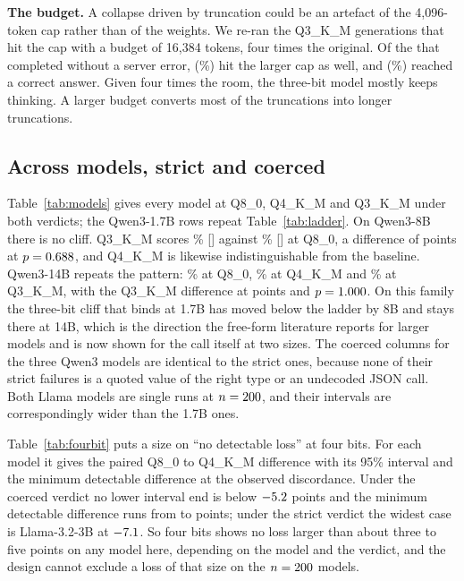 \documentclass[12pt,letterpaper]{article}
\newcommand{\qm}{Qwen3-1.7B}
\begin{document}
\textbf{The budget.} A collapse driven by truncation could be an artefact of the 4{,}096-token cap rather than of the weights. We re-ran the \qtBudOf{} Q3\_K\_M generations that hit the cap with a budget of 16{,}384 tokens, four times the original. Of the \qtBudN{} that completed without a server error, \qtBudStillCap{} (\qtBudStillCapPct{}\%) hit the larger cap as well, and \qtBudRecovered{} (\qtBudRecoveredPct{}\%) reached a correct answer. Given four times the room, the three-bit model mostly keeps thinking. A larger budget converts most of the truncations into longer truncations.

\subsection{Across models, strict and coerced}
\label{sec:models}

Table~\ref{tab:models} gives every model at Q8\_0, Q4\_K\_M and Q3\_K\_M under both verdicts; the \qm{} rows repeat Table~\ref{tab:ladder}. On Qwen3-8B there is no cliff. Q3\_K\_M scores \qtAccEightBThree{}\% [\qtCiEightBThree{}] against \qtAccEightBEight{}\% [\qtCiEightBEight{}] at Q8\_0, a difference of \qtDeltaEightBThree{} points at $p=0.688{}$, and Q4\_K\_M is likewise indistinguishable from the baseline. Qwen3-14B repeats the pattern: \qtAccFourteenBEight{}\% at Q8\_0, \qtAccFourteenBFour{}\% at Q4\_K\_M and \qtAccFourteenBThree{}\% at Q3\_K\_M, with the Q3\_K\_M difference at \qtDeltaFourteenBThree{} points and $p=1.000{}$. On this family the three-bit cliff that binds at 1.7B has moved below the ladder by 8B and stays there at 14B, which is the direction the free-form literature reports for larger models and is now shown for the call itself at two sizes. The coerced columns for the three Qwen3 models are identical to the strict ones, because none of their strict failures is a quoted value of the right type or an undecoded JSON call. Both Llama models are single runs at $n=200{}$, and their intervals are correspondingly wider than the 1.7B ones.

Table~\ref{tab:fourbit} puts a size on ``no detectable loss'' at four bits. For each model it gives the paired Q8\_0 to Q4\_K\_M difference with its 95\% interval and the minimum detectable difference at the observed discordance. Under the coerced verdict no lower interval end is below $-5.2{}$ points and the minimum detectable difference runs from \qtFourBitMdeMin{} to \qtFourBitMdeMax{} points; under the strict verdict the widest case is Llama-3.2-3B at $-7.1{}$. So four bits shows no loss larger than about three to five points on any model here, depending on the model and the verdict, and the design cannot exclude a loss of that size on the $n=200{}$ models.
\end{document}
